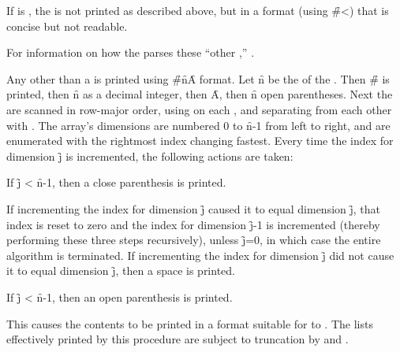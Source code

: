 If  is , the  is not printed
as described above, but
in a format (using \f{\#<}) that is concise but not readable.

For information on how the  parses these ``other ,''
\seesection\SharpsignLeftParen.

\endsubsubsection%

Any  other than a  is printed
using \f{\#}\f{n}\f{A} format.
Let \f{n} be the  of the .
Then \f{\#} is printed, then \f{n} as a decimal integer,
then \f{A}, then \f{n} open parentheses.  
Next the  are scanned in row-major order,
using  on each , 
and separating  from each other with .
The array's dimensions are numbered 0 to \f{n}-1 from left to right,
and are enumerated with the rightmost index changing fastest.
Every time the index for dimension \f{j} is incremented,
the following actions are taken:

\beginlist
\itemitem{\bull}
If \f{j} < \f{n}-1, then a close parenthesis is printed.

\itemitem{\bull}
If incrementing the index for dimension \f{j} caused it to equal
dimension \f{j}, that index is reset to zero and the
index for dimension \f{j}-1 is incremented (thereby performing these three steps recursively),
unless \f{j}=0, in which case the entire algorithm is terminated.
If incrementing the index for dimension \f{j} did not cause it to
equal dimension \f{j}, then a space is printed.

\itemitem{\bull}
If \f{j} < \f{n}-1, then an open parenthesis is printed.
\endlist

This causes the contents to be printed in a format suitable for
 to .
The lists effectively printed by this procedure are subject to
truncation by  and .

